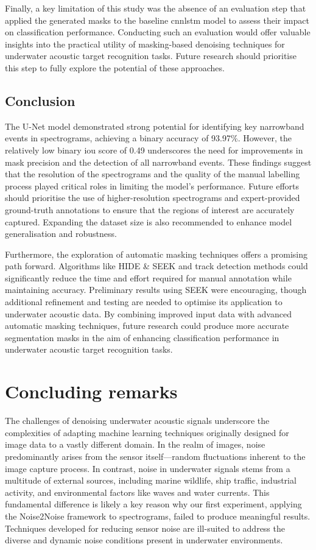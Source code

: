 Finally, a key limitation of this study was the absence of an evaluation step that applied the generated masks to the baseline \acrshort{cnnlstm} model to assess their impact on classification performance. Conducting such an evaluation would offer valuable insights into the practical utility of masking-based denoising techniques for underwater acoustic target recognition tasks. Future research should prioritise this step to fully explore the potential of these approaches.

\subsection{Conclusion}

The U-Net model demonstrated strong potential for identifying key narrowband events in spectrograms, achieving a binary accuracy of 93.97\%. However, the relatively low binary \acrshort{iou} score of 0.49 underscores the need for improvements in mask precision and the detection of all narrowband events. These findings suggest that the resolution of the spectrograms and the quality of the manual labelling process played critical roles in limiting the model's performance. Future efforts should prioritise the use of higher-resolution spectrograms and expert-provided ground-truth annotations to ensure that the regions of interest are accurately captured. Expanding the dataset size is also recommended to enhance model generalisation and robustness.

Furthermore, the exploration of automatic masking techniques offers a promising path forward. Algorithms like HIDE \& SEEK and track detection methods could significantly reduce the time and effort required for manual annotation while maintaining accuracy. Preliminary results using SEEK were encouraging, though additional refinement and testing are needed to optimise its application to underwater acoustic data. By combining improved input data with advanced automatic masking techniques, future research could produce more accurate segmentation masks in the aim of enhancing classification performance in underwater acoustic target recognition tasks.

\section{Concluding remarks}

The challenges of denoising underwater acoustic signals underscore the complexities of adapting machine learning techniques originally designed for image data to a vastly different domain. In the realm of images, noise predominantly arises from the sensor itself—random fluctuations inherent to the image capture process. In contrast, noise in underwater signals stems from a multitude of external sources, including marine wildlife, ship traffic, industrial activity, and environmental factors like waves and water currents. This fundamental difference is likely a key reason why our first experiment, applying the Noise2Noise framework to spectrograms, failed to produce meaningful results. Techniques developed for reducing sensor noise are ill-suited to address the diverse and dynamic noise conditions present in underwater environments.

